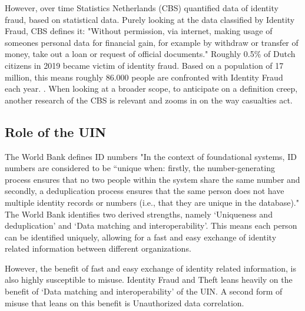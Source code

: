 However, over time Statistics Netherlands (CBS) quantified data of identity fraud, based on statistical data. Purely looking at the data classified by Identity Fraud, CBS defines it: "Without permission, via internet, making usage of someones personal data for financial gain, for example by withdraw or transfer of money, take out a loan or request of official documents." Roughly 0.5\% of Dutch citizens in 2019 became victim of identity fraud. Based on a population of 17 million, this means roughly 86.000 people are confronted with Identity Fraud each year. 
{}.
When looking at a broader scope, to anticipate on a definition creep, another research of the CBS is relevant {\cite{CBS_casualtiesDigitalCrime}} and zooms in on the way casualties act.

\subsection{Role of the UIN}
The World Bank \cite{WorldBank_UIN} defines ID numbers "In the context of foundational systems, ID numbers are considered to be “unique when: firstly, the number-generating process ensures that no two people within the system share the same number and secondly, a deduplication process ensures that the same person does not have multiple identity records or numbers (i.e., that they are unique in the database)." The World Bank identifies two derived strengths, namely ‘Uniqueness and deduplication’ and ‘Data matching and interoperability’. This means each person can be identified uniquely, allowing for a fast and easy exchange of identity related information between different organizations.\par 
However, the benefit of fast and easy exchange of identity related information, is also highly susceptible to misuse. Identity Fraud and Theft leans heavily on the benefit of ‘Data matching and interoperability’ of the UIN. A second form of misuse that leans on this benefit is Unauthorized data correlation. \par

